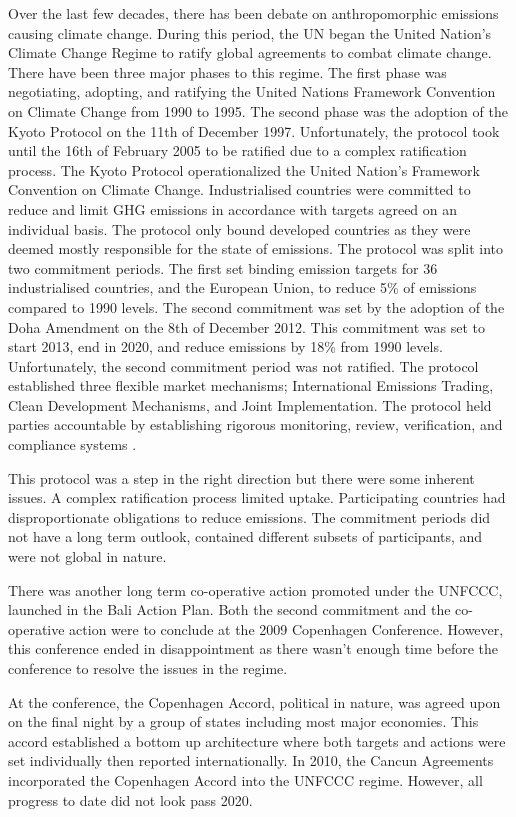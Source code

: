 \documentclass[12pt]{article}
\begin{document}
Over the last few decades, there has been debate on anthropomorphic emissions causing climate change. 
During this period, the UN began the United Nation's Climate Change Regime to ratify global agreements to combat climate change. 
There have been three major phases to this regime. 
The first phase was negotiating, adopting, and ratifying the United Nations Framework Convention on Climate Change from 1990 to 1995.
The second phase was the adoption of the Kyoto Protocol on the 11th of December 1997. 
Unfortunately, the protocol took until the 16th of February 2005 to be ratified due to a complex ratification process. 
The Kyoto Protocol operationalized the United Nation's Framework Convention on Climate Change. 
Industrialised countries were committed to reduce and limit GHG emissions in accordance with targets agreed on an individual basis. 
The protocol only bound developed countries as they were deemed mostly responsible for the state of emissions. 
The protocol was split into two commitment periods. 
The first set binding emission targets for 36 industrialised countries, and the European Union, to reduce 5\% of emissions compared to 1990 levels.
The second commitment was set by the adoption of the Doha Amendment on the 8th of December 2012. 
This commitment was set to start 2013, end in 2020, and reduce emissions by 18\% from 1990 levels. 
Unfortunately, the second commitment period was not ratified. 
The protocol established three flexible market mechanisms; International Emissions Trading, Clean Development Mechanisms, and Joint Implementation. 
The protocol held parties accountable by establishing rigorous monitoring, review, verification, and compliance systems \cite{W:7}.

This protocol was a step in the right direction but there were some inherent issues. 
A complex ratification process limited uptake. 
Participating countries had disproportionate obligations to reduce emissions. 
The commitment periods did not have a long term outlook, contained different subsets of participants, and were not global in nature.

There was another long term co-operative action promoted under the UNFCCC, launched in the Bali Action Plan. 
Both the second commitment and the co-operative action were to conclude at the 2009 Copenhagen Conference. 
However, this conference ended in disappointment as there wasn't enough time before the conference to resolve the issues in the regime.

At the conference, the Copenhagen Accord, political in nature, was agreed upon on the final night by a group of states including most major economies. 
This accord established a bottom up architecture where both targets and actions were set individually then reported internationally. 
In 2010, the Cancun Agreements incorporated the Copenhagen Accord into the UNFCCC regime. However, all progress to date did not look pass 2020. 
\end{document}
